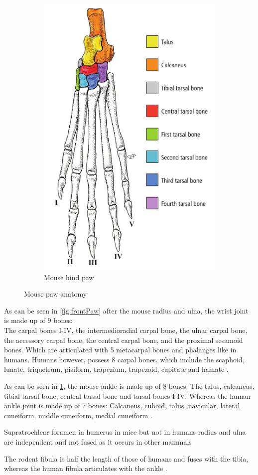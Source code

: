 \begin{figure}[h]
\begin{subfigure}{0.49\textwidth}
		\includegraphics[scale=0.5]{images/mouseHindPaw.png}
		\caption{Mouse hind paw \cite{ruberteMorphologicalMousePhenotyping2017}}\label{fig:hindPaw}
	\end{subfigure}
	\caption{Mouse paw anatomy}\label{fig:mousePaws}
\end{figure}

\noindent
As can be seen in \cref{fig:frontPaw} after the mouse radius and ulna, the wrist joint is made up of 9 bones:\\
The carpal bones I-IV, the intermedioradial carpal bone, the ulnar carpal bone, the accessory carpal bone,
the central carpal bone, and the proximal sesamoid bones.
Which are articulated with 5 metacarpal bones and phalanges like in humans.
Humans however, possess 8 carpal bones, which include the scaphoid, lunate, triquetrum, pisiform,
trapezium, trapezoid, capitate and hamate \cite{platzerTaschenatlasAnatomieBd2013}.

\noindent
As can be seen in \cref{fig:hindPaw}, the mouse ankle is made up of 8 bones:
The talus, calcaneus, tibial tarsal bone, central tarsal bone and tarsal bones I-IV.
Whereas the human ankle joint is made up of 7 bones:
Calcaneus, cuboid, talus, navicular, lateral cuneiform, middle cuneiform, medial cuneiform \cite{platzerTaschenatlasAnatomieBd2013}.

\noindent
Supratrochlear foramen in humerus in mice but not in humans \cite{ruberteMorphologicalMousePhenotyping2017,platzerTaschenatlasAnatomieBd2013}
radius and ulna are independent and not fused as it occurs in other mammals

\noindent
The rodent fibula is half the length of those of humans and fuses with the tibia,
whereas the human fibula articulates with the ankle \cite{jeromeSkeletalSystem2018,platzerTaschenatlasAnatomieBd2013}.

